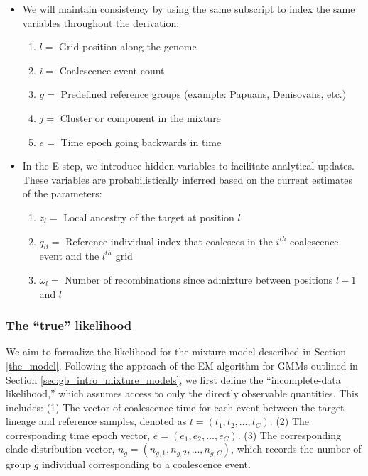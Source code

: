 \begin{itemize}
    \item We will maintain consistency by using the same subscript to index the same variables throughout the derivation:
    \begin{enumerate}
        \item $l =$ Grid position along the genome
        \item $i =$ Coalescence event count
        \item $g =$ Predefined reference groups (example: Papuans, Denisovans, etc.)
        \item $j =$ Cluster or component in the mixture
        \item $e =$ Time epoch going backwards in time
    \end{enumerate}

    \item In the E-step, we introduce hidden variables to facilitate analytical updates. These variables are probabilistically inferred based on the current estimates of the parameters:
    \begin{enumerate}
        \item $z_l =$ Local ancestry of the target at position $l$
        \item $q_{li} =$ Reference individual index that coalesces in the $i^{th}$ coalescence event and the $l^{th}$ grid
        \item $\omega_l =$ Number of recombinations since admixture between positions $l-1$ and $l$
    \end{enumerate}
\end{itemize}


\subsubsection{The ``true'' likelihood}
We aim to formalize the likelihood for the mixture model described in Section \ref{the_model}. Following the approach of the EM algorithm for GMMs outlined in Section \ref{sec:gb_intro_mixture_models}, we first define the ``incomplete-data likelihood,'' which assumes access to only the directly observable quantities. This includes: (1) The vector of coalescence time for each event between the target lineage and reference samples, denoted as $t = (t_1, t_2, \ldots, t_C)$. (2) The corresponding time epoch vector, $e = (e_1, e_2, \ldots, e_C)$. (3) The corresponding clade distribution vector, $n_g = (n_{g,1}, n_{g,2}, \ldots, n_{g,C})$, which records the number of group $g$ individual corresponding to a coalescence event. 

